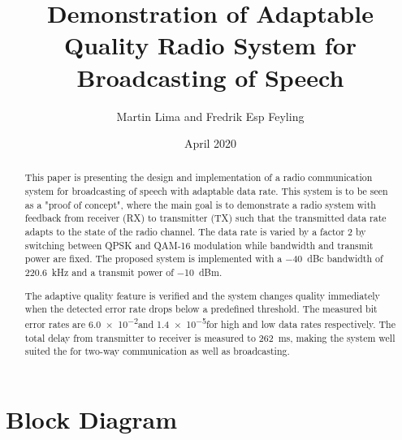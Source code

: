 \documentclass[9pt,journal]{IEEEtran}
\title{Demonstration of Adaptable Quality Radio System for Broadcasting of Speech}
\author{Martin Lima and Fredrik Esp Feyling }
\date{April 2020}
\newcommand{\measBW}{220.6} %
\newcommand{\measPWR}{-10} %
\newcommand{\measDelay}{262} %
\newcommand{\measBERQAMGood}{\SI{6.0e-2}{\;}}
\newcommand{\measBERQPSKBad}{\SI{1.4e-5}{\;}}
\begin{document}
\maketitle
\begin{abstract} 
This paper is presenting the design and implementation of a radio communication system for broadcasting of speech with adaptable data rate. This system is to be seen as a "proof of concept", where the main goal is to demonstrate a radio system with feedback from receiver (RX) to transmitter (TX) such that the transmitted data rate adapts to the state of the radio channel. The data rate is varied by a factor 2 by switching between QPSK and QAM-16 modulation while bandwidth and transmit power are fixed. The proposed system is implemented with a \SI{-40}{dBc} bandwidth of \SI{\measBW}{\kilo\hertz} and a transmit power of \SI{\measPWR}{dBm}.

The adaptive quality feature is verified and the system changes quality immediately when the detected error rate drops below a predefined threshold. The measured bit error rates are \measBERQAMGood  and \measBERQPSKBad for high and low data rates respectively. The total delay from transmitter to receiver is measured to \SI{\measDelay}{\milli\second}, making the system well suited the for two-way communication as well as broadcasting. 
\end{abstract}







\newpage











\appendices

\section{Block Diagram}
\label{a:block_diagram}


\end{document}
